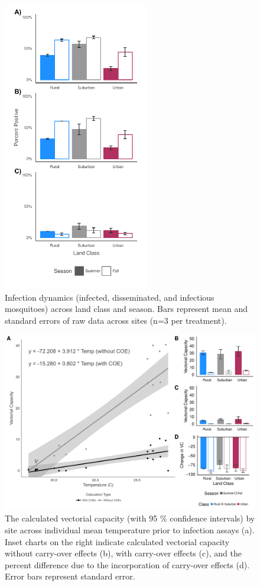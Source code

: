 \documentclass[12pt]{article}
\begin{document}
\begin{figure}
\centering\includegraphics[height=5in, keepaspectratio]{Fig2.pdf}
\caption{Infection dynamics (infected, disseminated, and infectious mosquitoes) across land class and season. Bars represent mean and standard errors of raw data across sites (n=3 per treatment).}
\label{Fig:Infxclass}
\end{figure}

\begin{figure}
\centering\includegraphics[width=5in]{Fig3.pdf}
\caption{The calculated vectorial capacity (with 95 \% confidence intervals) by site across individual mean temperature prior to infection assays (a). Inset charts on the right indicate calculated vectorial capacity without carry-over effects (b), with carry-over effects (c), and the percent difference due to the incorporation of carry-over effects (d). Error bars represent standard error.}
\label{Fig:VC}
\end{figure}
\end{document}
